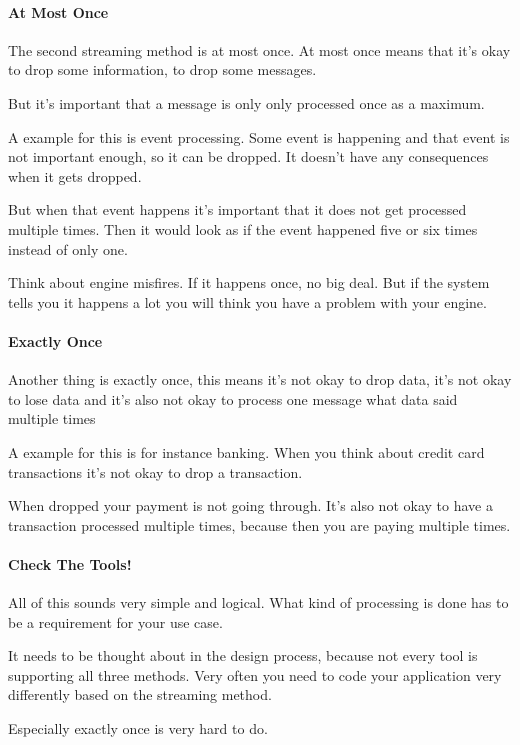 \documentclass[12pt]{scrartcl} %
\begin{document}
\paragraph{At Most Once}

The second streaming method is at most once. At most once means that it’s okay to drop some information, to drop some messages.

But it’s important that a message is only only processed once as a maximum.

A example for this is event processing. Some event is happening and that event is not important enough, so it can be dropped. It doesn’t have any consequences when it gets dropped.

But when that event happens it’s important that it does not get processed multiple times. Then it would look as if the event happened five or six times instead of only one.

Think about engine misfires. If it happens once, no big deal. But if the system tells you it happens a lot you will think you have a problem with your engine.

\paragraph{Exactly Once}

Another thing is exactly once, this means it’s not okay to drop data, it’s not okay to lose data and it’s also not okay to process one message what data said multiple times

A example for this is for instance banking. When you think about credit card transactions it’s not okay to drop a transaction.

When dropped your payment is not going through. It’s also not okay to have a transaction processed multiple times, because then you are paying multiple times.

\paragraph{Check The Tools!}

All of this sounds very simple and logical. What kind of processing is done has to be a requirement for your use case.

It needs to be thought about in the design process, because not every tool is supporting all three methods. Very often you need to code your application very differently based on the streaming method.

Especially exactly once is very hard to do.
\end{document}
